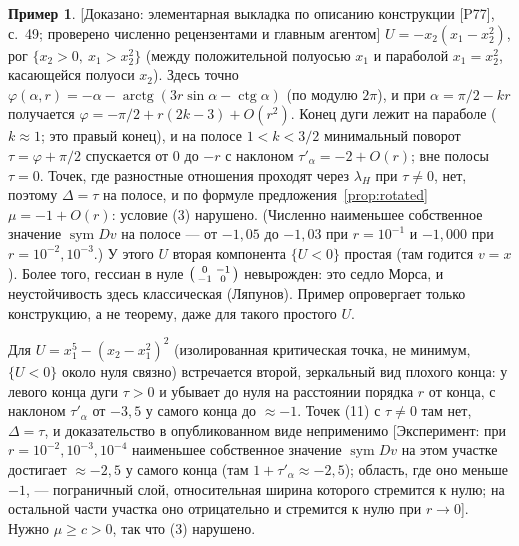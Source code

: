 \documentclass[11pt,a4paper]{article}
\theoremstyle{definition}
\newtheorem{example}[theorem]{Пример}
\newcommand{\sym}{\operatorname{sym}}
\newcommand{\mk}[1]{\textsf{[#1]}}
\begin{document}
\begin{example}\label{ex:gap}
\mk{Доказано: элементарная выкладка по описанию конструкции [P77], с.~49; проверено численно
рецензентами и главным агентом} $U=-x_2(x_1-x_2^2)$, рог $\{x_2>0,\ x_1>x_2^2\}$ (между
положительной полуосью $x_1$ и параболой $x_1=x_2^2$, касающейся полуоси $x_2$). Здесь точно
$\varphi(\alpha,r)=-\alpha-\operatorname{arctg}(3r\sin\alpha-\operatorname{ctg}\alpha)$ (по модулю $2\pi$), и при
$\alpha=\pi/2-kr$ получается $\varphi=-\pi/2+r(2k-3)+O(r^2)$. Конец дуги лежит на параболе
($k\approx1$; это правый конец), и на полосе $1<k<3/2$ минимальный поворот $\tau=\varphi+\pi/2$
спускается от $0$ до $-r$ с наклоном $\tau'_\alpha=-2+O(r)$; вне полосы $\tau=0$. Точек, где
разностные отношения проходят через $\lambda_H$ при $\tau\ne0$, нет, поэтому $\Delta=\tau$ на полосе,
и по формуле предложения~\ref{prop:rotated} $\mu=-1+O(r)$: условие (3) нарушено. (Численно
наименьшее собственное значение $\sym Dv$ на полосе --- от $-1{,}05$ до $-1{,}03$ при $r=10^{-1}$ и
$-1{,}000$ при $r=10^{-2},10^{-3}$.) У этого $U$ вторая компонента $\{U<0\}$ простая (там годится
$v=x$). Более того, гессиан в нуле $\begin{psmallmatrix}0&-1\\-1&0\end{psmallmatrix}$ невырожден: это
седло Морса, и неустойчивость здесь классическая (Ляпунов). Пример опровергает только
конструкцию, а не теорему, даже для такого простого $U$.

Для $U=x_1^5-(x_2-x_1^2)^2$ (изолированная критическая точка, не минимум, $\{U<0\}$ около нуля
связно) встречается второй, зеркальный вид плохого конца: у левого конца дуги $\tau>0$ и убывает до
нуля на расстоянии порядка $r$ от конца, с наклоном $\tau'_\alpha$ от $-3{,}5$ у самого конца до
$\approx-1$. Точек (11) с $\tau\ne0$ там нет, $\Delta=\tau$, и доказательство в опубликованном
виде неприменимо \mk{Эксперимент: при $r=10^{-2},10^{-3},10^{-4}$ наименьшее собственное значение
$\sym Dv$ на этом участке достигает $\approx-2{,}5$ у самого конца (там $1+\tau'_\alpha\approx-2{,}5$);
область, где оно меньше $-1$, --- пограничный слой, относительная ширина которого стремится к
нулю; на остальной части участка оно отрицательно и стремится к нулю при $r\to0$}. Нужно
$\mu\ge c>0$, так что (3) нарушено.
\end{example}
\end{document}
